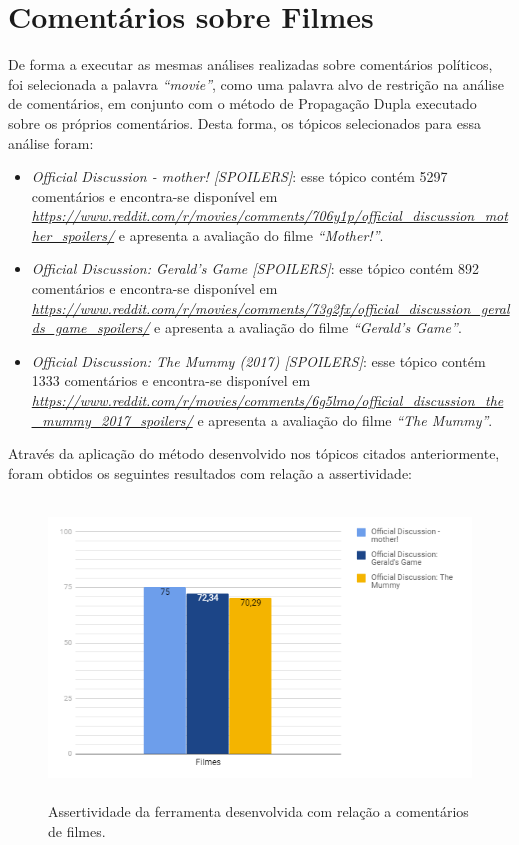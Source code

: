 \section{Comentários sobre Filmes}

De forma a executar as mesmas análises realizadas sobre comentários políticos,
foi selecionada a palavra \textit{``movie''}, como uma palavra alvo de restrição
na análise de comentários, em conjunto com o método de Propagação Dupla executado
sobre os próprios comentários. Desta forma, os tópicos selecionados para
essa análise foram:

\begin{itemize}
  \item
  \textit{Official Discussion - mother! [SPOILERS]}: esse tópico contém 5297
  comentários e encontra-se disponível em
  \textit{\url{https://www.reddit.com/r/movies/comments/706y1p/official_discussion_mother_spoilers/}}
  e apresenta a avaliação do filme \textit{``Mother!''}.
  \item
  \textit{Official Discussion: Gerald's Game [SPOILERS]}: esse tópico contém 892
  comentários e
  encontra-se disponível em
  \textit{\url{https://www.reddit.com/r/movies/comments/73g2fx/official_discussion_geralds_game_spoilers/}}
  e apresenta a avaliação do filme \textit{``Gerald's Game''}.
    \item
  \textit{Official Discussion: The Mummy (2017) [SPOILERS]}: esse tópico contém
  1333 comentários e
  encontra-se disponível em
  \textit{\url{https://www.reddit.com/r/movies/comments/6g5lmo/official_discussion_the_mummy_2017_spoilers/}}
  e apresenta a avaliação do filme \textit{``The Mummy''}.
  
\end{itemize}


Através da aplicação do método desenvolvido nos tópicos citados anteriormente,
foram obtidos os seguintes resultados com relação a assertividade:

\begin{figure}[!htbp]
\centering
\includegraphics[height=300px]{imagens/filmes1.png}
\caption{Assertividade da ferramenta desenvolvida com relação a comentários de
filmes.}
\label{fig:fil1}
\end{figure}


